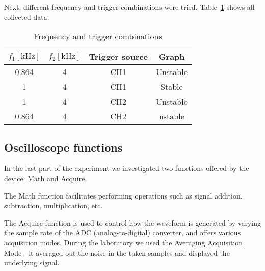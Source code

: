 Next, different frequency and trigger combinations were tried. Table~\ref{tab:triggering} shows all collected data.

\begin{table}[H]
	\centering
	\begin{tabular}{c|c|c|c}
		$f_{1} [\unit{\kilo\hertz}]$ & $f_{2} [\unit{\kilo\hertz}]$ & Trigger source & Graph\\
		\hline
		0.864 & 4 & CH1 & Unstable\\
		\hline
		1 & 4 & CH1 & Stable\\
		\hline
		1 & 4 & CH2 & Unstable\\
		\hline
		0.864 & 4 & CH2 & nstable\\
	\end{tabular}
	\caption{Frequency and trigger combinations}
	\label{tab:triggering}
\end{table}

\subsection{Oscilloscope functions}
In the last part of the experiment we investigated two functions offered by the device: Math and Acquire.

The Math function facilitates performing operations such as signal addition, subtraction, multiplication, etc.

The Acquire function is used to control how the waveform is generated by varying the sample rate of the ADC (analog-to-digital) converter, and offers various acquisition modes. During the laboratory we used the Averaging Acquisition Mode - it averaged out the noise in the taken samples and displayed the underlying signal.
